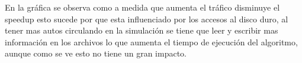 En la gráfica se observa como a medida que aumenta el tráfico disminuye el speedup esto sucede por que esta influenciado por los accesos al disco duro, al tener mas autos circulando en la simulación se tiene que leer y escribir mas información en los archivos lo que aumenta el tiempo de ejecución del algoritmo, aunque como se ve esto no tiene un gran impacto.
